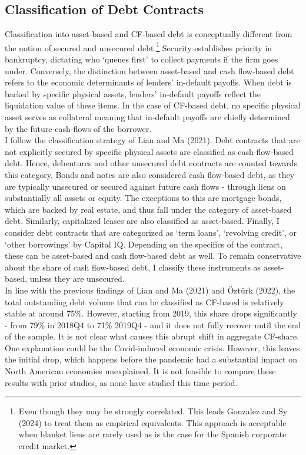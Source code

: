 \documentclass[12pt]{article}
\begin{document}
\subsection{Classification of Debt Contracts \label{sec:classification}}
Classification into asset-based and CF-based debt is conceptually different from the notion of secured and unsecured debt.\footnote{Even though they may be strongly correlated. This leads Gonzalez and Sy (2024) to treat them as empirical equivalents. This approach is acceptable when blanket liens are rarely used as is the case for the Spanish corporate credit market.} Security establishes priority in bankruptcy, dictating who `queues first' to collect payments if the firm goes under. Conversely, the distinction between asset-based and cash flow-based debt refers to the economic determinants of lenders' in-default payoffs. When debt is backed by specific physical assets, lenders' in-default payoffs reflect the liquidation value of these items. In the case of CF-based debt, no specific physical asset serves as collateral meaning that in-default payoffs are chiefly determined by the future cash-flows of the borrower. \vspace{3mm} \\
I follow the classification strategy of Lian and Ma (2021). Debt contracts that are not explicitly secured by specific physical assets are classified as cash-flow-based debt. Hence, debentures and other unsecured debt contracts are counted towards this category. Bonds and notes are also considered cash flow-based debt, as they are typically unsecured or secured against future cash flows - through liens on substantially all assets or equity. The exceptions to this are mortgage bonds, which are backed by real estate, and thus fall under the category of asset-based debt. Similarly, capitalized leases are also classified as asset-based. Finally, I consider debt contracts that are categorized as `term loans', `revolving credit', or `other borrowings' by Capital IQ. Depending on the specifics of the contract, these can be asset-based and cash flow-based debt as well. To remain conservative about the share of cash flow-based debt, I classify these instruments as asset-based, unless they are unsecured. \vspace{3mm} \\ 
In line with the previous findings of Lian and Ma (2021) and Öztürk (2022), the total outstanding debt volume that can be classified as CF-based is relatively stable at around 75\%. However, starting from 2019, this share drops significantly - from 79\% in 2018Q4 to 71\% 2019Q4 - and it does not fully recover until the end of the sample. It is not clear what causes this abrupt shift in aggregate CF-share. One explanation could be the Covid-induced economic crisis. However, this leaves the initial drop, which happens before the pandemic had a substantial impact on North American economies unexplained. It is not feasible to compare these results with prior studies, as none have studied this time period.
\end{document}
